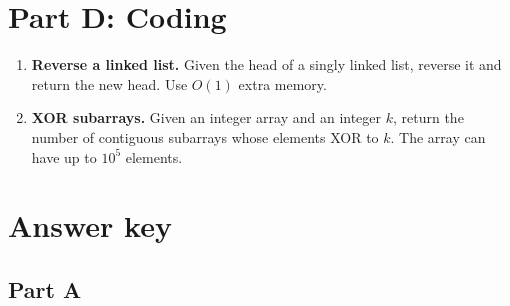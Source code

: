 \section{Part D: Coding}

\begin{enumerate}
  \item \textbf{Reverse a linked list.} Given the head of a singly linked list, reverse it and return the new head. Use $O(1)$ extra memory.
  \item \textbf{XOR subarrays.} Given an integer array and an integer $k$, return the number of contiguous subarrays whose elements XOR to $k$. The array can have up to $10^5$ elements.
\end{enumerate}

\section{Answer key}

\subsection*{Part A}

